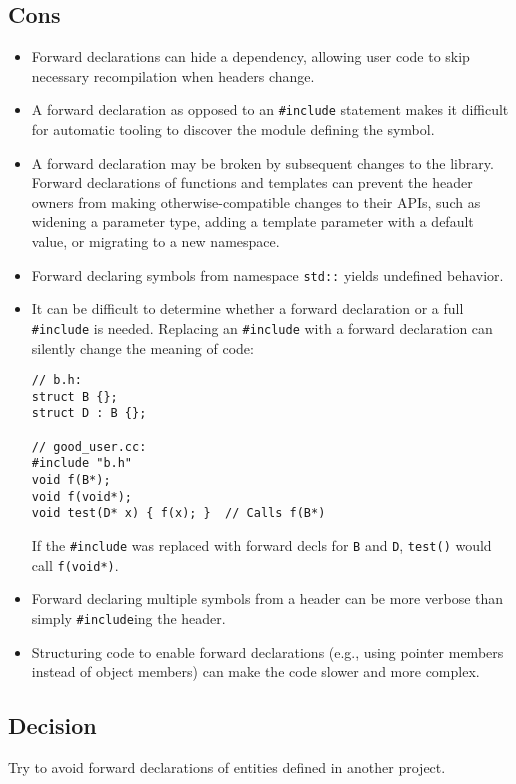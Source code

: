 \subsection{Cons}
\begin{itemize}
    \item Forward declarations can hide a dependency, allowing user code to skip necessary recompilation when headers change.
    \item A forward declaration as opposed to an \texttt{#include} statement makes it difficult for automatic tooling to discover the module defining the symbol.
    \item A forward declaration may be broken by subsequent changes to the library. Forward declarations of functions and templates can prevent the header owners from making otherwise-compatible changes to their APIs, such as widening a parameter type, adding a template parameter with a default value, or migrating to a new namespace.
    \item Forward declaring symbols from namespace \texttt{std::} yields undefined behavior.
    \item It can be difficult to determine whether a forward declaration or a full \texttt{#include} is needed. Replacing an \texttt{#include} with a forward declaration can silently change the meaning of code:
    \begin{verbatim}
// b.h:
struct B {};
struct D : B {};

// good_user.cc:
#include "b.h"
void f(B*);
void f(void*);
void test(D* x) { f(x); }  // Calls f(B*)
    \end{verbatim}
    If the \texttt{#include} was replaced with forward decls for \texttt{B} and \texttt{D}, \texttt{test()} would call \texttt{f(void*)}.
    \item Forward declaring multiple symbols from a header can be more verbose than simply \texttt{#include}ing the header.
    \item Structuring code to enable forward declarations (e.g., using pointer members instead of object members) can make the code slower and more complex.
\end{itemize}
\subsection{Decision}
Try to avoid forward declarations of entities defined in another project.